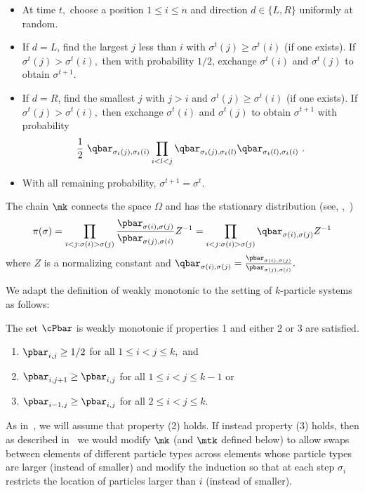 \vspace{.1in}

\vspace{.05in}
\begin{itemize}
\item At time $t,$ choose a position $1\leq i \leq n$ and direction 
$d \in \{L, R\}$ uniformly at random.  
\item If $d = L$, find the largest $j$ less than $i$ with $\sigma^t(j) \geq \sigma^t(i)$ (if one exists).  If $\sigma^t(j) > \sigma^t(i),$ then 
with probability $1/2$,
exchange $\sigma^t(i)$ and $\sigma^t(j)$ to obtain $\sigma^{t+1}.$  
\item If $d = R$, find the smallest $j$ with  $j>i$ and $\sigma^t(j) \geq \sigma^t(i)$ (if one exists).  If $\sigma^t(j) > \sigma^t(i),$ then exchange $\sigma^t(i)$ and $\sigma^t(j)$ to obtain $\sigma^{t+1}$ with probability 
$$\frac{1}{2}~ \qbar_{\sigma_t(j),\sigma_t(i)}  \prod_{i<l<j} \qbar_{\sigma_t(j),\sigma_t(l)}\qbar_{\sigma_t(l),\sigma_t(i)}\,\,.$$


\item With all remaining probability, $\sigma^{t+1} = \sigma^t$.
\end{itemize}

\noindent The chain $\mk$  connects the space $\Omega$ and has the stationary distribution (see, \eg,~\cite{bmrs})
$$\pi(\sigma) = \prod_{i < j: \sigma(i) > \sigma(j)}\frac{\pbar_{\sigma(i),\sigma(j)}}{\pbar_{\sigma(j),\sigma(i)}} Z^{-1} = \prod_{i < j: \sigma(i) > \sigma(j)}\qbar_{\sigma(i), \sigma(j)} Z^{-1} $$ where $Z$ is a normalizing constant and $\qbar_{\sigma(i), \sigma(j)}=\frac{\pbar_{\sigma(i),\sigma(j)}}{\pbar_{\sigma(j),\sigma(i)}}.$  

We adapt the definition of weakly monotonic to the setting of $k$-particle systems as follows:
 
\begin{definition}\label{mono}The set $\cPbar$ is weakly monotonic if properties 1 and either 2 or 3 are satisfied.
\begin{enumerate}
\item $\pbar_{i,j} \geq 1/2$ for all $1 \leq i < j \leq k,$ and
\item $\pbar_{i,j+1} \geq \pbar_{i,j}$ for all $1 \leq i < j \leq k-1$ or
\item $\pbar_{i-1,j} \geq \pbar_{i,j}$ for all $2 \leq i < j \leq k.$
\end{enumerate}
\end{definition}
\noindent As in~\cite{MS}, we will assume that property (2) holds.  If
instead property (3) holds, then as described in~\cite{MS} we would
modify $\mk$ (and $\mtk$ defined below) to allow swaps between
elements of different particle types across elements whose particle
types are larger (instead of smaller) and modify the induction so
that at each step $\sigma_{i}$ restricts the location of particles
larger than $i$ (instead of smaller).


